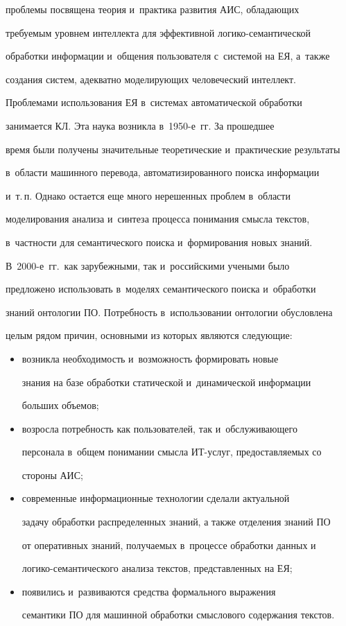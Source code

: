 проблемы посвящена теория и~практика развития АИС, обладающих 


требуемым уровнем интеллекта для эффективной логико-семантической 


обработки информации и~общения пользователя с~системой на ЕЯ, а~также 


создания систем, адекватно моделирующих человеческий интеллект. 


Проблемами использования ЕЯ в~системах автоматической обработки 


занимается КЛ. Эта наука возникла в~1950-е~гг. За прошедшее 


время были получены значительные теоретические и~практические результаты 


в~области машинного перевода, автоматизированного поиска информации 


и~т.\,п. Однако остается еще много нерешенных проблем в~области 


моделирования анализа и~синтеза процесса понимания смысла текстов, 


в~част\-ности для семантического поиска и~формирования новых знаний. 


В~2000-е~гг.\ как зарубежными, так и~российскими учеными было 


предложено использовать в~моделях семантического поиска и~обработки 


знаний онтологии ПО. Потребность в~использовании онтологии обусловлена 


целым рядом причин, основными из которых являются следующие:


  \begin{itemize}


\item возникла необходимость и~возможность формировать новые 


знания на базе обработки статической и~динамической информации 


больших объемов;


\item возросла потребность как пользователей, так и~обслуживающего 


персонала в~общем понимании смысла ИТ-услуг, предоставляемых со 


стороны АИС;


\item современные информационные технологии сделали актуальной 


задачу обработки распределенных знаний, а также отделения знаний ПО 


от оперативных знаний, получаемых в~процессе обработки данных и~


ло\-ги\-ко-се\-ман\-ти\-че\-ско\-го анализа текстов, представленных на ЕЯ;


\item появились и~развиваются средства формального выражения 


семантики ПО для машинной обработки смыслового содержания текстов.


\end{itemize}





